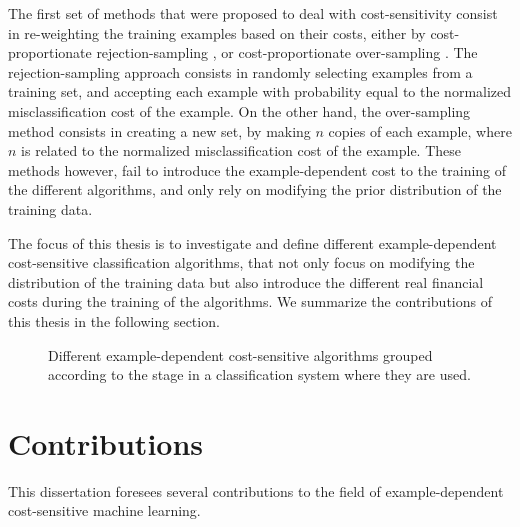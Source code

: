   The first set of methods that were proposed to deal with cost-sensitivity consist in 
  re-weighting the training examples based on their costs, either by cost-proportionate 
  rejection-sampling \citep{Zadrozny2003}, or cost-proportionate over-sampling \citep{Elkan2001}.
  The rejection-sampling approach consists in randomly selecting examples from a training set, and 
  accepting each example with probability equal to the normalized misclassification cost of the 
  example. On the other hand, the over-sampling method consists in creating a new set, by making 
  $n$ copies of each example, where $n$ is related to the normalized misclassification cost of the 
  example. These methods however, fail to introduce the example-dependent cost to the training of 
  the different algorithms, and only rely on modifying the prior distribution of the training data.

  The focus of this thesis is to investigate and define different example-dependent cost-sensitive
  classification algorithms, that not only focus on modifying the distribution of the training data
  but also introduce the different real financial costs during the training of the 
  algorithms. We summarize the contributions of this thesis in the following section.
  
  \begin{figure}
  \centering
  
  \caption{Different example-dependent cost-sensitive algorithms grouped according to the 
    stage in a classification system where they are used.}
  \label{fig:1:1}
  \end{figure}

\newpage
\section{Contributions}

This dissertation foresees several contributions to the field of example-dependent 
cost-sensitive machine learning.
  
